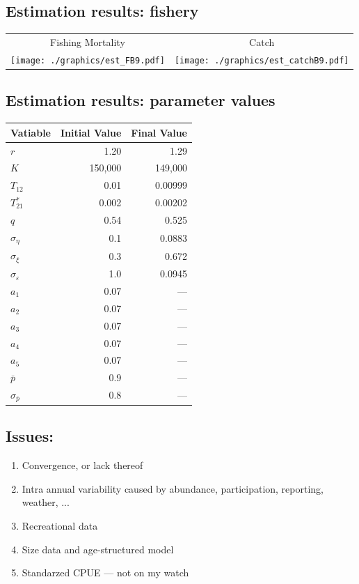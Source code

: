 \documentclass[a4paper,KOMA,landscape,titlepage]{powersem}
\begin{document}
\begin{slide}\section{Estimation results: fishery}
\begin{center}
\begin{tabular}{cc}
{\tiny Fishing Mortality} & {\tiny Catch}\\
\texttt{[image: ./graphics/est\_FB9.pdf]}&
\texttt{[image: ./graphics/est\_catchB9.pdf]}\\
\end{tabular}
\end{center}
\end{slide}

\begin{slide}\section{Estimation results: parameter values}
{\renewcommand{\arraystretch}{0.8}
\begin{center}
\begin{tabular}{lrr}
\hline
Vatiable & Initial Value & Final Value\\
\hline
\hline
$r$ & 1.20&  1.29\\
$K$ & 150,000 & 149,000 \\
$T_{12}$ & 0.01 & 0.00999\\
$T^*_{21}$& 0.002 & 0.00202\\
$q$ & 0.54 & 0.525\\
\hline
$\sigma_\eta$ & 0.1 & 0.0883\\
$\sigma_\xi$ & 0.3 & 0.672\\
$\sigma_\varepsilon$ & 1.0 & 0.0945\\
$a_1$ & 0.07 & ---\\
$a_2$ & 0.07 & ---\\
$a_3$ & 0.07 & ---\\
$a_4$ & 0.07 & ---\\
$a_5$ & 0.07 & ---\\
\hline
$\bar{p}$ & 0.9 & ---\\
$\sigma_{\bar{p}}$ & 0.8 & ---\\
\hline
\end{tabular}
\end{center}
}
\end{slide}

\begin{slide}\section{Issues:}
\begin{enumerate}
\item Convergence, or lack thereof
\item Intra annual variability caused by abundance, participation,
reporting, weather, ...
\item Recreational data
\item Size data and age-structured model
\item Standarzed CPUE --- not on my watch
\end{enumerate}
\end{slide}
\end{document}
